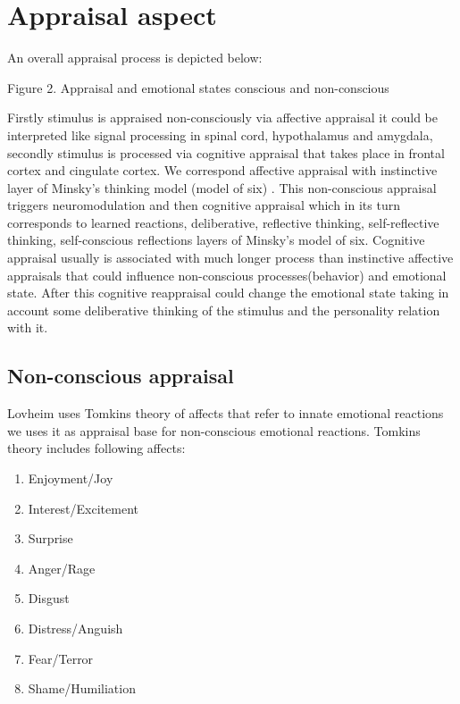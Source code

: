 \section{Appraisal aspect}


An overall appraisal process is depicted below:

\begin{center}
Figure 2. Appraisal and emotional states conscious and non-conscious
\end{center}

Firstly stimulus is appraised non-consciously via affective appraisal it could be interpreted like signal processing in spinal cord, hypothalamus and amygdala, secondly stimulus is processed via cognitive appraisal that takes place in frontal cortex and cingulate cortex. We correspond affective appraisal with instinctive layer of Minsky's thinking model (model of six) \cite{emotionmachine}. This non-conscious appraisal triggers neuromodulation \cite{cubeofemotions} and then cognitive appraisal which in its turn corresponds to learned reactions, deliberative, reflective thinking, self-reflective thinking, self-conscious reflections layers of Minsky's model of six. Cognitive appraisal usually is associated with much longer process than instinctive affective appraisals that could influence non-conscious processes(behavior) and emotional state. After this cognitive reappraisal could change the emotional state taking in account some deliberative thinking of the stimulus and the personality relation with it.

\subsection{Non-conscious appraisal}

Lovheim uses Tomkins theory of affects that refer to innate emotional reactions we uses it as appraisal base for non-conscious emotional reactions. Tomkins theory \cite{tomkins1, tomkins2, tomkins3, quest} includes following affects:

\begin{enumerate}
 \item  Enjoyment/Joy
 \item  Interest/Excitement
 \item  Surprise
 \item  Anger/Rage
 \item  Disgust
 \item  Distress/Anguish
 \item  Fear/Terror
 \item  Shame/Humiliation
\end{enumerate}

